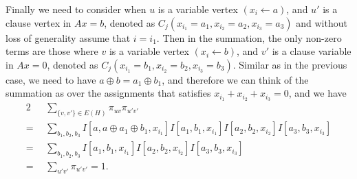 \documentclass[a4paper,twoside,justified]{tufte-handout}
\begin{document}
\begin{description}
    Finally we need to consider when $u$ is a variable vertex $(x_i \leftarrow a)$,
    and $u'$ is a clause vertex in $Ax=b$, denoted as $C_j(x_{i_1}=a_1,x_{i_2}=a_2,x_{i_3}=a_3)$
    and without loss of generality assume that $i=i_1$.
    Then in the summation, the only non-zero terms are those where $v$ is a variable vertex $(x_i \leftarrow b)$,
    and $v'$ is a clause variable in $Ax=0$, denoted as $C_j(x_{i_1}=b_1,x_{i_2}=b_2,x_{i_3}=b_3)$.
    Similar as in the previous case, we need to have $a \oplus b=a_1 \oplus b_1$,
    and therefore we can think of the summation as over the assignments that satisfies $x_{i_1}+x_{i_2}+x_{i_3}=0$,
    and we have
    \begin{alignat*}{2}
      &~ \sum_{\{v,v'\} \in E(H)} \pi_{uv} \pi_{u'v'} \\
      = ~&~ \sum_{b_1,b_2,b_3} I[a,a \oplus a_1 \oplus b_1,x_{i_1}] I[a_1,b_1,x_{i_1}] I[a_2,b_2,x_{i_2}] I[a_3,b_3,x_{i_3}] \\
      = ~&~ \sum_{b_1,b_2,b_3} I[a_1,b_1,x_{i_1}] I[a_2,b_2,x_{i_2}] I[a_3,b_3,x_{i_3}] \\
      = ~&~ \sum_{u'v'} \pi_{u'v'} = 1.
    \end{alignat*}
\end{description}
\end{document}
